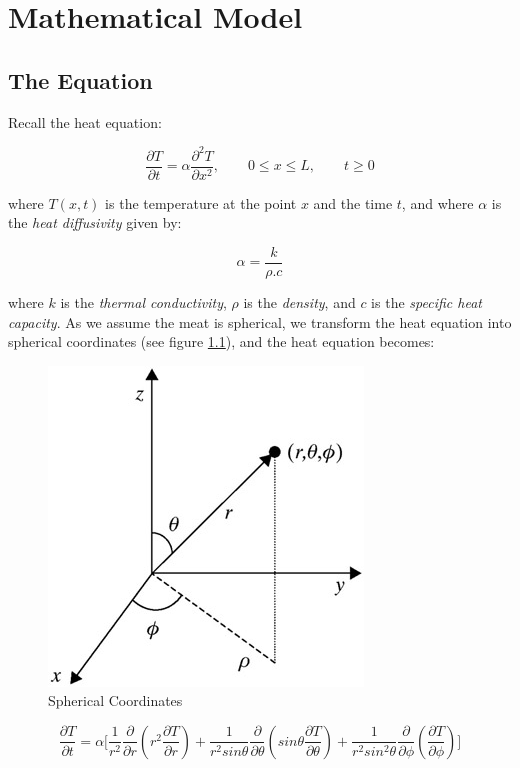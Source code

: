 \documentclass{report}
\begin{document}
\chapter{Mathematical Model}




\section{The Equation}

Recall the heat equation:\bigskip

\[ \frac{\partial T}{\partial t} = \alpha \frac{\partial^2 T}{\partial x^2}, \qquad 0 \leq x \leq L, \qquad t \geq 0 \]\medskip

where $T(x, t)$ is the temperature at the point $x$ and the time $t$, and where $\alpha$ is the 
\emph{heat diffusivity} given by:\bigskip

\[ \alpha = \frac{k}{\rho . c} \]\medskip

where $k$ is the \emph{thermal conductivity}, $\rho$ is the \emph{density}, and $c$ is the 
\emph{specific heat capacity}. As we assume the meat is spherical, we transform the heat equation into spherical 
coordinates (see figure \ref{fig:sc}), and the heat equation becomes:\bigskip

\begin{figure}
\centering
\includegraphics[scale = 0.25]{spherical-coordinates}
\caption{Spherical Coordinates}
\label{fig:sc}
\end{figure}

\[ 
\frac{\partial T}{\partial t} = \alpha 
\Bigg[ 
\frac{1}{r^2} \frac{\partial}{\partial r} \left( r^2 \frac{\partial T}{\partial r} \right)
 + \frac{1}{r^2 sin \theta} \frac{\partial}{\partial \theta} \left( sin \theta \frac{\partial T}{\partial \theta} \right)
 + \frac{1}{r^2 sin^2 \theta} \frac{\partial}{\partial \phi} \left( \frac{\partial T}{\partial \phi} \right)
\Bigg]
\]\medskip
\end{document}
